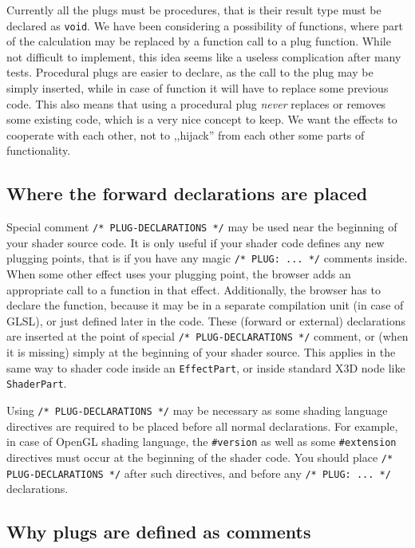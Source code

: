 \documentclass{acmsiggraph}                     %
\begin{document}
Currently all the plugs must be procedures, that is their result type
must be declared as \texttt{void}. We have been considering
a possibility of functions, where part of the calculation may be replaced
by a function call to a plug function. While not difficult to implement,
this idea seems like a useless complication after many tests.
Procedural plugs are easier to declare, as the call to the plug
may be simply inserted, while in case of function it will have to replace
some previous code. This also means that using a procedural plug
\textit{never} replaces or removes some existing code, which is a very nice
concept to keep. We want the effects to cooperate with each other,
not to ,,hijack'' from each other some parts of functionality.

\subsection{Where the forward declarations are placed}

Special comment \texttt{/* PLUG-DECLARATIONS */} may be used
near the beginning of your shader source code. It is only useful
if your shader code defines any new plugging points, that is if you
have any magic \texttt{/* PLUG: ... */} comments inside.
When some other effect uses your plugging point, the browser adds
an appropriate call to a function in that effect.
Additionally, the browser has to declare the function,
because it may be in a separate compilation unit (in case of GLSL),
or just defined later in the code.
These (forward or external) declarations are inserted at
the point of special \texttt{/* PLUG-DECLARATIONS */}
comment, or (when it is missing) simply at the beginning of your shader source.
This applies in the same way to shader code inside an \texttt{EffectPart},
or inside standard X3D node like \texttt{ShaderPart}.

Using \texttt{/* PLUG-DECLARATIONS */} may be necessary
as some shading language directives are required to be placed before
all normal declarations. For example, in case of OpenGL shading language,
the \texttt{\#version} as well as some \texttt{\#extension} directives
must occur at the beginning of the shader code. You should place
\texttt{/* PLUG-DECLARATIONS */} after such directives,
and before any \texttt{/* PLUG: ... */} declarations.

\subsection{Why plugs are defined as comments}
\end{document}
